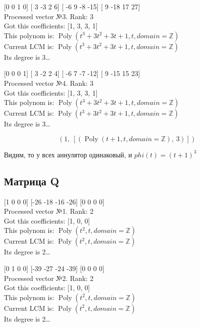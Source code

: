 \documentclass[12pt, a4paper]{article}
\begin{document}
    [0 0 1 0] [ 3 -3  2  6] [ -6   9  -8 -15] [  9 -18  17  27] \\
    Processed vector №3. Rank: 3\\
    Got this coefficients: [1, 3, 3, 1]\\
    This polynom is: $\operatorname{Poly}{\left( t^{3} + 3 t^{2} + 3 t + 1, t, domain=\mathbb{Z} \right)}$\\
    Current LCM is: $\operatorname{Poly}{\left( t^{3} + 3 t^{2} + 3 t + 1, t, domain=\mathbb{Z} \right)}$\\
    Its degree is 3…

    [0 0 0 1] [ 3 -2  2  4] [ -6   7  -7 -12] [  9 -15  15  23] \\
    Processed vector №4. Rank: 3\\
    Got this coefficients: [1, 3, 3, 1]\\
    This polynom is: $\operatorname{Poly}{\left( t^{3} + 3 t^{2} + 3 t + 1, t, domain=\mathbb{Z} \right)}$\\
    Current LCM is: $\operatorname{Poly}{\left( t^{3} + 3 t^{2} + 3 t + 1, t, domain=\mathbb{Z} \right)}$\\
    Its degree is 3…

    \begin{equation}\left( 1, \  \left[ \left( \operatorname{Poly}{\left( t + 1, t, domain=\mathbb{Z} \right)}, \  3\right)\right]\right)\end{equation}

    Видим, то у всех аннулятор одинаковый, и $phi(t) = (t + 1)^3$

    \subsection{Матрица Q}

    [1 0 0 0] [-26 -18 -16 -26] [0 0 0 0] \\
    Processed vector №1. Rank: 2\\
    Got this coefficients: [1, 0, 0]\\
    This polynom is: $\operatorname{Poly}{\left( t^{2}, t, domain=\mathbb{Z} \right)}$\\
    Current LCM is: $\operatorname{Poly}{\left( t^{2}, t, domain=\mathbb{Z} \right)}$\\
    Its degree is 2…

    [0 1 0 0] [-39 -27 -24 -39] [0 0 0 0] \\
    Processed vector №2. Rank: 2\\
    Got this coefficients: [1, 0, 0]\\
    This polynom is: $\operatorname{Poly}{\left( t^{2}, t, domain=\mathbb{Z} \right)}$\\
    Current LCM is: $\operatorname{Poly}{\left( t^{2}, t, domain=\mathbb{Z} \right)}$\\
    Its degree is 2…
\end{document}
